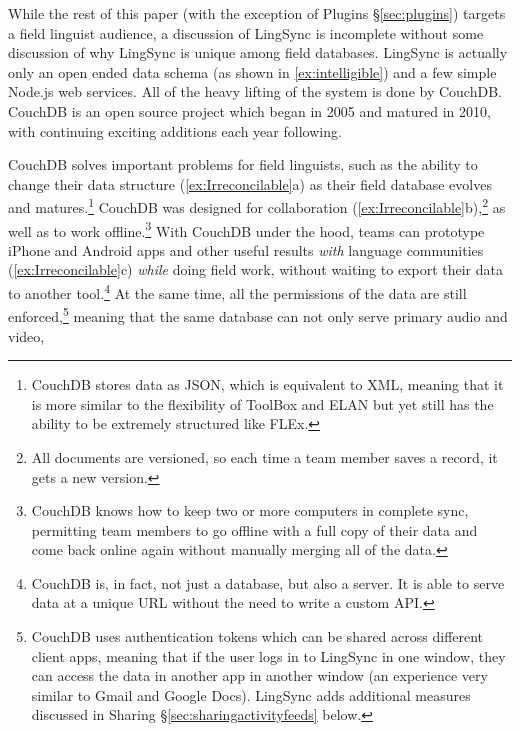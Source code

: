 \documentclass[letterpaper, 12pt, dvips]{mitwpl}
\begin{document}
While the rest of this paper (with the exception of Plugins \S \ref{sec:plugins}) targets a field linguist audience, a discussion of LingSync is incomplete without some discussion of why LingSync is unique among field databases.
LingSync is actually only an open ended  data schema (as shown in \ref{ex:intelligible}) %
and a few simple Node.js web services. All of the heavy lifting of the system is done by CouchDB. CouchDB is an open source  project which began in 2005 and matured in 2010, with continuing exciting additions each year following. 

CouchDB  solves important problems for field linguists, such as the ability to change their  data structure (\ref{ex:Irreconcilable}a) as their field database evolves
and matures.\footnote{CouchDB stores data as JSON, which is equivalent to XML, meaning that it is more similar to the flexibility of ToolBox and ELAN but yet still has the ability to be extremely structured like FLEx.} 
CouchDB was designed for collaboration  (\ref{ex:Irreconcilable}b),\footnote{All documents are versioned, so each time a team member saves a record, it gets a new version.} 
as well as to work offline.\footnote{CouchDB knows how to keep two or more computers in complete sync, permitting team members to go offline with a full copy of their data and come back online again without manually merging all of the data.}
 With CouchDB under the hood, teams can prototype iPhone and Android apps  and other useful results \emph{with} language communities (\ref{ex:Irreconcilable}c) \emph{while} doing field work, without waiting  to export their data to another tool.\footnote{CouchDB is, in fact, not just a database, but also a server. It is able to serve data at a unique URL without the need to write a custom API.} 
 At the same time, all the permissions of the data are still enforced,\footnote{CouchDB uses authentication tokens which can be shared across different client apps, meaning that if the user logs in to LingSync in one window, they can access the data in another app in another window (an experience very similar to Gmail and Google Docs). LingSync adds additional measures discussed in Sharing \S \ref{sec:sharingactivityfeeds} below.} 
 meaning that the same database can not only serve primary audio and video,
\end{document}
